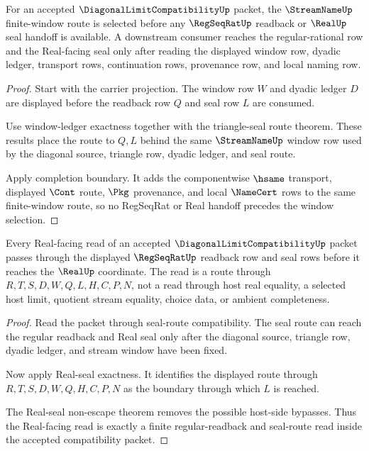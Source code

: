 \begin{theorem}
\label{thm:diagonal-limit-compatibility-root-window-route}
For an accepted $\DiagonalLimitCompatibilityUp$ packet, the
$\StreamNameUp$ finite-window route is selected before any $\RegSeqRatUp$
readback or $\RealUp$ seal handoff is available. A downstream consumer reaches
the regular-rational row and the Real-facing seal only after reading the
displayed window row, dyadic ledger, transport rows, continuation rows,
provenance row, and local naming row.
\end{theorem}
\begin{proof}
Start with the carrier projection. The window row $W$ and dyadic ledger $D$
are displayed before the readback row $Q$ and seal row $L$ are consumed.

Use window-ledger exactness together with the triangle-seal route theorem.
These results place the route to $Q,L$ behind the same $\StreamNameUp$ window
row used by the diagonal source, triangle row, dyadic ledger, and seal route.

Apply completion boundary. It adds the componentwise $\hsame$ transport,
displayed $\Cont$ route, $\Pkg$ provenance, and local $\NameCert$ rows to the
same finite-window route, so no RegSeqRat or Real handoff precedes the window
selection.
\end{proof}

\begin{theorem}
\label{thm:diagonal-limit-compatibility-root-seal-boundary}
Every Real-facing read of an accepted $\DiagonalLimitCompatibilityUp$ packet
passes through the displayed $\RegSeqRatUp$ readback row and seal rows before
it reaches the $\RealUp$ coordinate. The read is a route through
$R,T,S,D,W,Q,L,H,C,P,N$, not a read through host real equality, a selected host
limit, quotient stream equality, choice data, or ambient completeness.
\end{theorem}
\begin{proof}
Read the packet through seal-route compatibility. The seal route can reach the
regular readback and Real seal only after the diagonal source, triangle row,
dyadic ledger, and stream window have been fixed.

Now apply Real-seal exactness. It identifies the displayed route through
$R,T,S,D,W,Q,H,C,P,N$ as the boundary through which $L$ is reached.

The Real-seal non-escape theorem removes the possible host-side bypasses.
Thus the Real-facing read is exactly a finite regular-readback and seal-route
read inside the accepted compatibility packet.
\end{proof}

